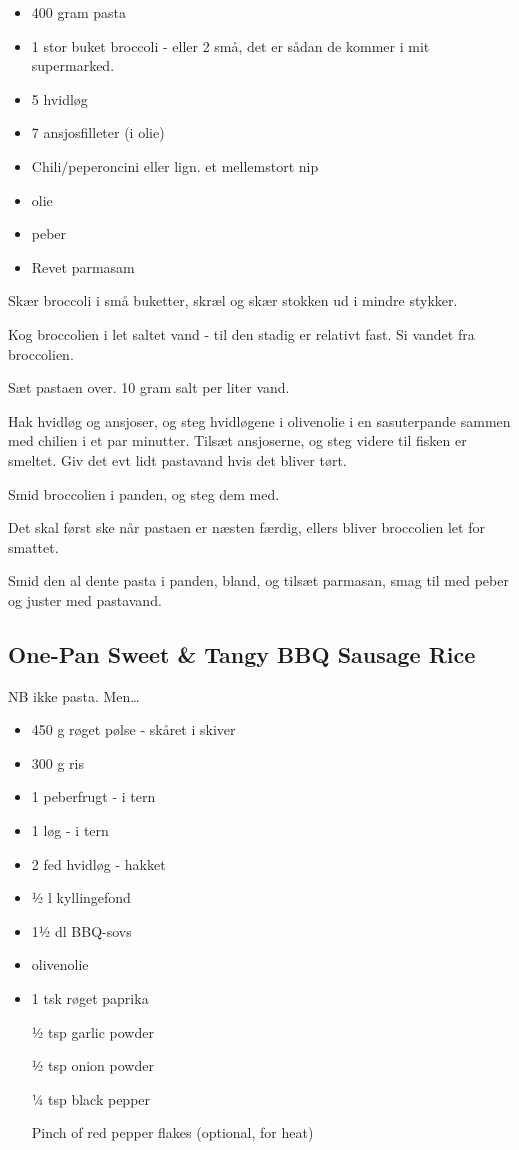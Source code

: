 \documentclass[
  letterpaper,
  DIV=11,
  numbers=noendperiod]{scrreprt}
\providecommand{\tightlist}{%
  \setlength{\itemsep}{0pt}\setlength{\parskip}{0pt}}\usepackage{longtable,booktabs,array}
\begin{document}
\begin{itemize}
\tightlist
\item
  400 gram pasta
\item
  1 stor buket broccoli - eller 2 små, det er sådan de kommer i mit
  supermarked.
\item
  5 hvidløg
\item
  7 ansjosfilleter (i olie)
\item
  Chili/peperoncini eller lign. et mellemstort nip
\item
  olie
\item
  peber
\item
  Revet parmasam
\end{itemize}

Skær broccoli i små buketter, skræl og skær stokken ud i mindre stykker.

Kog broccolien i let saltet vand - til den stadig er relativt fast. Si
vandet fra broccolien.

Sæt pastaen over. 10 gram salt per liter vand.

Hak hvidløg og ansjoser, og steg hvidløgene i olivenolie i en
sasuterpande sammen med chilien i et par minutter. Tilsæt ansjoserne, og
steg videre til fisken er smeltet. Giv det evt lidt pastavand hvis det
bliver tørt.

Smid broccolien i panden, og steg dem med.

Det skal først ske når pastaen er næsten færdig, ellers bliver
broccolien let for smattet.

Smid den al dente pasta i panden, bland, og tilsæt parmasan, smag til
med peber og juster med pastavand.

\hypertarget{one-pan-sweet-tangy-bbq-sausage-rice}{%
\subsection{One-Pan Sweet \& Tangy BBQ Sausage
Rice}\label{one-pan-sweet-tangy-bbq-sausage-rice}}

NB ikke pasta. Men\ldots{}

\begin{itemize}
\item
  450 g røget pølse - skåret i skiver
\item
  300 g ris
\item
  1 peberfrugt - i tern
\item
  1 løg - i tern
\item
  2 fed hvidløg - hakket
\item
  ½ l kyllingefond
\item
  1½ dl BBQ-sovs
\item
  olivenolie
\item
  1 tsk røget paprika

  ½ tsp garlic powder

  ½ tsp onion powder

  ¼ tsp black pepper

  Pinch of red pepper flakes (optional, for heat)
\end{itemize}
\end{document}
